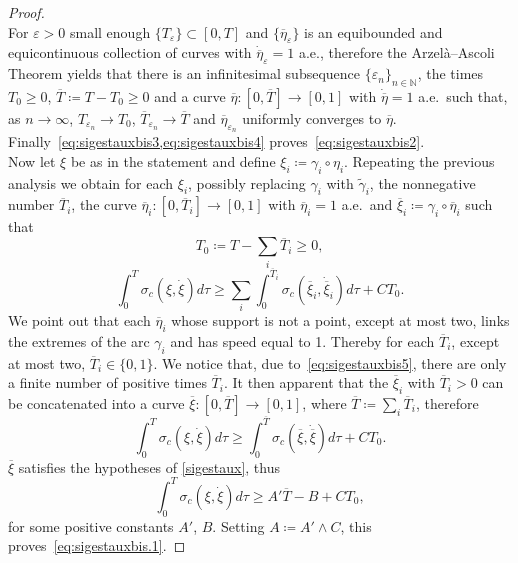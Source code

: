 \documentclass[11pt,a4paper,american]{article}
\newcommand{\Nds}{\mathds N}
\newcommand{\ovT}{\overline T}
\newcommand{\oveta}{\overline\eta}
\newcommand{\wtgamma}{\widetilde\gamma}
\newcommand{\ovxi}{\overline\xi}
\begin{document}
\begin{proof}
\begin{equation}
        \end{equation}
        For $\varepsilon>0$ small enough $\{T_\varepsilon\}\subset[0,T]$ and $\{\oveta_\varepsilon\}$ is an equibounded and equicontinuous collection of curves with $\dot\oveta_\varepsilon=1$ a.e., therefore the Arzelà--Ascoli Theorem yields that there is an infinitesimal subsequence $\{\varepsilon_n\}_{n\in\Nds}$, the times $T_0\ge0$, $\ovT\coloneqq T-T_0\ge0$ and a curve $\oveta:\left[0,\ovT\right]\to[0,1]$ with $\dot\oveta=1$ a.e.\ such that, as $n\to\infty$, $T_{\varepsilon_n}\to T_0$, $\ovT_{\varepsilon_n}\to\ovT$ and $\oveta_{\varepsilon_n}$ uniformly converges to $\oveta$. Finally~\cref{eq:sigestauxbis3,eq:sigestauxbis4} proves~\cref{eq:sigestauxbis2}.\\
        Now let $\xi$ be as in the statement and define $\xi_i\coloneqq\gamma_i\circ\eta_i$. Repeating the previous analysis we obtain for each $\xi_i$, possibly replacing $\gamma_i$ with $\wtgamma_i$, the nonnegative number $\ovT_i$, the curve $\oveta_i:\left[0,\ovT_i\right]\to[0,1]$ with $\oveta_i=1$ a.e.\ and $\ovxi_i\coloneqq\gamma_i\circ\oveta_i$ such that
        \begin{equation}\label{eq:sigestauxbis5}
            T_0\coloneqq T-\sum_i\ovT_i\ge0,
        \end{equation}
        \begin{equation*}
            \int_0^T\sigma_c\left(\xi,\dot\xi\right)d\tau\ge\sum_i\int_0^{\ovT_i}\sigma_c\left(\ovxi_i,\dot\ovxi_i\right)d\tau+CT_0.
        \end{equation*}
        We point out that each $\oveta_i$ whose support is not a point, except at most two, links the extremes of the arc $\gamma_i$ and has speed equal to 1. Thereby for each $\ovT_i$, except at most two, $\ovT_i\in\{0,1\}$. We notice that, due to~\cref{eq:sigestauxbis5}, there are only a finite number of positive times $\ovT_i$. It then apparent that the $\ovxi_i$ with $\ovT_i>0$ can be concatenated into a curve $\ovxi:\left[0,\ovT\right]\to[0,1]$, where $\ovT\coloneqq\sum_i\ovT_i$, therefore
        \begin{equation*}
            \int_0^T\sigma_c\left(\xi,\dot\xi\right)d\tau\ge\int_0^{\ovT}\sigma_c\left(\ovxi,\dot\ovxi\right)d\tau+CT_0.
        \end{equation*}
        $\ovxi$ satisfies the hypotheses of \cref{sigestaux}, thus
        \begin{equation*}
            \int_0^T\sigma_c\left(\xi,\dot\xi\right)d\tau\ge A'\ovT-B+CT_0,
        \end{equation*}
        for some positive constants $A'$, $B$. Setting $A\coloneqq A'\wedge C$, this proves~\cref{eq:sigestauxbis.1}.
    \end{proof}
\end{document}
